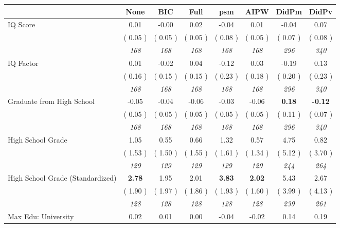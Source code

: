 \begin{tabular}{l c c c c c c c}
\toprule
 & None & BIC & Full & psm & AIPW & DidPm & DidPv \\
\midrule
IQ Score &      0.01 &     -0.00 &      0.02 &     -0.04 &      0.01 &     -0.04 &      0.07 \\
& (     0.05 ) & (     0.05 ) & (     0.05 ) & (     0.08 ) & (     0.05 ) & (     0.07 ) & (     0.08 ) \\
& \textit{ 168 } & \textit{ 168 } & \textit{ 168 } & \textit{ 168 } & \textit{ 168 } & \textit{ 296 } & \textit{ 340 } \\
IQ Factor &      0.01 &     -0.02 &      0.04 &     -0.12 &      0.03 &     -0.19 &      0.13 \\
& (     0.16 ) & (     0.15 ) & (     0.15 ) & (     0.23 ) & (     0.18 ) & (     0.20 ) & (     0.23 ) \\
& \textit{ 168 } & \textit{ 168 } & \textit{ 168 } & \textit{ 168 } & \textit{ 168 } & \textit{ 296 } & \textit{ 340 } \\
Graduate from High School &     -0.05 &     -0.04 &     -0.06 &     -0.03 &     -0.06 & \textbf{      0.18 } & \textbf{     -0.12 } \\
& (     0.05 ) & (     0.05 ) & (     0.05 ) & (     0.05 ) & (     0.05 ) & (     0.11 ) & (     0.07 ) \\
& \textit{ 168 } & \textit{ 168 } & \textit{ 168 } & \textit{ 168 } & \textit{ 168 } & \textit{ 296 } & \textit{ 340 } \\
High School Grade &      1.05 &      0.55 &      0.66 &      1.32 &      0.57 &      4.75 &      0.82 \\
& (     1.53 ) & (     1.50 ) & (     1.55 ) & (     1.61 ) & (     1.34 ) & (     5.12 ) & (     3.70 ) \\
& \textit{ 129 } & \textit{ 129 } & \textit{ 129 } & \textit{ 129 } & \textit{ 129 } & \textit{ 244 } & \textit{ 264 } \\
High School Grade (Standardized) & \textbf{      2.78 } &      1.95 &      2.01 & \textbf{     3.83} & \textbf{     2.02} &      5.43 &      2.67 \\
& (     1.90 ) & (     1.97 ) & (     1.86 ) & (     1.93 ) & (     1.60 ) & (     3.99 ) & (     4.13 ) \\
& \textit{ 128 } & \textit{ 128 } & \textit{ 128 } & \textit{ 128 } & \textit{ 128 } & \textit{ 239 } & \textit{ 261 } \\
Max Edu: University &      0.02 &      0.01 &      0.00 &     -0.04 &     -0.02 &      0.14 &      0.19 \\

\end{tabular}

